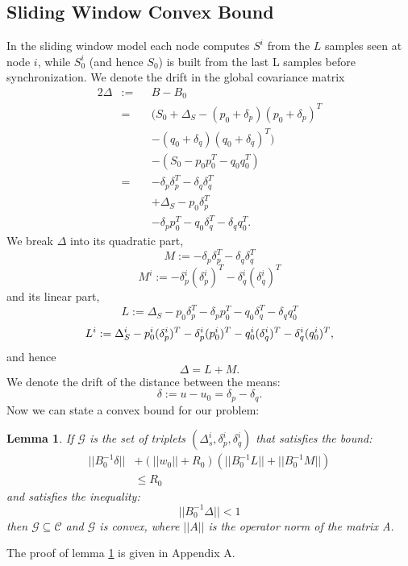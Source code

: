 \documentclass{sig-alternate-05-2015}
\newtheorem{lemma}{Lemma}
\begin{document}
\subsection{Sliding Window Convex Bound}
In the sliding window model each node computes $S^i$ from the $L$ samples seen
at node $i$, while $S_0^i$ (and hence $S_0$) is built from the last L samples before
synchronization. 
We denote the drift in the global covariance matrix
\begin{alignat*}{2}
\Delta & := && B-B_0 \\
& = && (S_0+\Delta_S - (p_0+\delta_p)(p_0+\delta_p)^T \\
& && - (q_0+\delta_q)(q_0+\delta_q)^T) \\
& && - (S_0 - p_0p_0^T - q_0q_0^T) \\
& = && - \delta_p\delta_p^T - \delta_q\delta_q^T \\
& && + \Delta_S - p_0\delta_p^T \\
& && - \delta_pp_0^T - q_0\delta_q^T - \delta_qq_0^T.
\end{alignat*}
We break $\Delta$ into its quadratic part,
\begin{equation*}
M:= - \delta_p\delta_p^T - \delta_q\delta_q^T
\end{equation*}
\begin{equation*}
M^i:= - \delta_p^i(\delta_p^i)^T - \delta_q^i(\delta_q^i)^T
\end{equation*}
and its linear part,
\begin{equation*}
L:= \Delta_S - p_0\delta_p^T - \delta_pp_0^T - q_0\delta_q^T - \delta_qq_0^T
\end{equation*}
\begin{equation*}
\\ L^i := \Delta_S^i - p_0^i(\delta_p^i)^T - \delta_p^i(p_0^i)^T -
q_0^i(\delta_q^i)^T - \delta_q^i(q_0^i)^T,
\end{equation*}
and hence 
\begin{equation*}
\Delta= L+ M.
\end{equation*}
We denote the drift of the distance between the means:
\begin{equation*}
\delta:= u-u_0 = \delta_p - \delta_q.
\end{equation*}
Now we can state a convex bound for our problem:
\begin{lemma} \label{convexBound}
If $\mathcal{G}$ is the set of triplets $(\Delta_s^i, \delta_p^i, \delta_q^i)$
 that satisfies the bound:
 \begin{equation} \label{eq:convexBound}
\begin{split}
||B_0^{-1}\delta|| &+ (||w_0||+R_0)(||B_0^{-1}L||+||B_0^{-1}M||) \\ & \leq  R_0
\end{split}
\end{equation}
and satisfies the inequality:
 \begin{equation*} 
||B_0^{-1}\Delta|| < 1
\end{equation*}
 then $\mathcal{G}
 \subseteq \mathcal{C}$ and $\mathcal{G}$ is convex, where $||A||$ is the
 operator norm of the matrix A.
\end{lemma}
The proof of lemma \ref{convexBound} is given in Appendix A.
\end{document}
